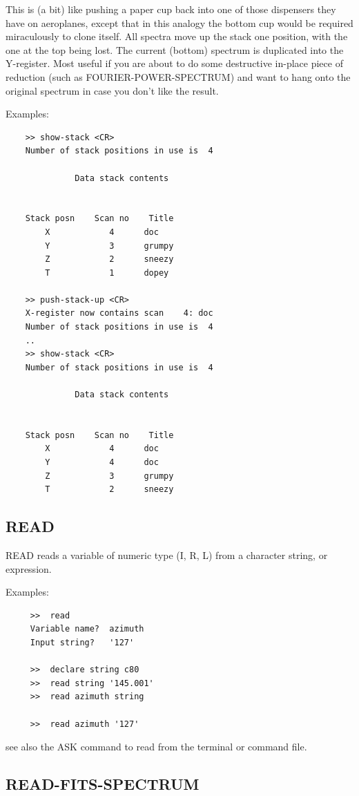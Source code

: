 \documentclass[11pt,twoside]{report}
\begin{document}
This is (a bit) like pushing a paper cup back into one of those dispensers they
have on aeroplanes, except that in this analogy the bottom cup would be
required miraculously to clone itself. All spectra move up the stack one
position, with the one at the top being lost. The current (bottom) spectrum
is duplicated into the Y-register. Most useful if you are about to do some
destructive in-place piece of reduction (such as FOURIER-POWER-SPECTRUM) and
want to hang onto the original spectrum in case you don't like the result.

Examples:
\begin{verbatim}
    >> show-stack <CR>
    Number of stack positions in use is  4

              Data stack contents


    Stack posn    Scan no    Title
        X            4      doc
        Y            3      grumpy
        Z            2      sneezy
        T            1      dopey

    >> push-stack-up <CR>
    X-register now contains scan    4: doc
    Number of stack positions in use is  4
    ..
    >> show-stack <CR>
    Number of stack positions in use is  4

              Data stack contents


    Stack posn    Scan no    Title
        X            4      doc
        Y            4      doc
        Z            3      grumpy
        T            2      sneezy

\end{verbatim}


\subsection{READ}

READ reads a variable of numeric type (I, R, L) from a character string,
or expression.

Examples:
\begin{verbatim}
     >>  read
     Variable name?  azimuth
     Input string?   '127'

     >>  declare string c80
     >>  read string '145.001'
     >>  read azimuth string

     >>  read azimuth '127'
\end{verbatim}

see also the ASK command to read from the terminal or command file.

\subsection{READ-FITS-SPECTRUM} 
\end{document}
